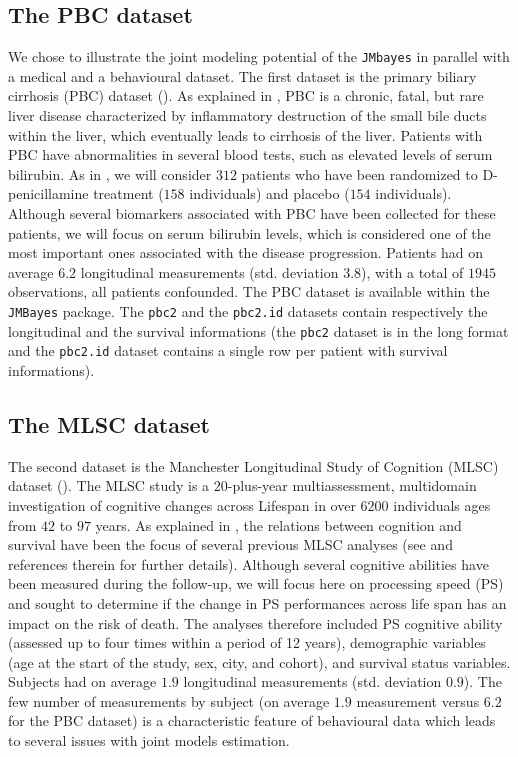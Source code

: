 \documentclass[12pt]{article}
\begin{document}
\subsection{The PBC dataset}
We chose to illustrate the joint modeling potential of the \texttt{JMbayes} in parallel with a medical and a behavioural dataset. The first dataset is the primary biliary cirrhosis (PBC) dataset (\cite{murtaugh1994primary}). As explained in \cite{JMbayes}, PBC is a chronic, fatal, but rare liver disease characterized by inflammatory destruction of the small bile ducts within the liver, which eventually leads to cirrhosis of the liver. Patients with PBC have abnormalities in several blood tests, such as elevated levels of serum bilirubin. As in \cite{JMbayes}, we will consider $312$ patients who have been randomized to D-penicillamine treatment ($158$ individuals) and placebo ($154$ individuals). Although several biomarkers associated with PBC have been collected for these patients, we will focus on serum bilirubin levels, which is considered one of the most important ones associated with the disease progression. Patients had on average $6.2$ longitudinal measurements (std. deviation $3.8$), with a total of $1945$ observations, all patients confounded. The PBC dataset is available within the \texttt{JMBayes} package. The \texttt{pbc2} and the \texttt{pbc2.id} datasets contain respectively the longitudinal and the survival informations (the \texttt{pbc2} dataset is in the long format and the \texttt{pbc2.id} dataset contains a single row per patient with survival informations). 

\subsection{The MLSC dataset}

The second dataset is the Manchester Longitudinal Study of Cognition (MLSC) dataset (\cite{Rabbitt2004}). The MLSC study is a $20$-plus-year multiassessment, multidomain investigation of cognitive changes across Lifespan in over $6200$ individuals ages from $42$ to $97$ years. As explained in \cite{aichele2015life}, the relations between cognition and survival have been the focus of several previous MLSC analyses (see \cite{aichele2015life} and references therein for further details). Although several cognitive abilities have been measured during the follow-up, we will focus here on processing speed (PS) and sought to determine if the change in PS performances across life span has an impact on the risk of death. The analyses therefore included PS cognitive ability (assessed up to four times within a period of 12 years), demographic variables (age at the start of the study, sex, city, and cohort), and survival status variables. Subjects had on average $1.9$ longitudinal measurements (std. deviation $0.9$). The few number of measurements by subject (on average $1.9$ measurement versus $6.2$ for the PBC dataset) is a characteristic feature of behavioural data which leads to several issues with joint models estimation.
\end{document}
